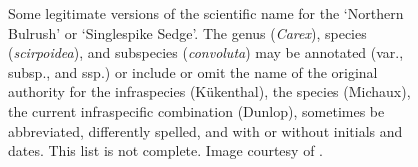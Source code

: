 \documentclass{bmcart}
\begin{document}

\newpage

\begin{figure}
  \begin{center}

  \caption{Some legitimate versions of the scientific name for the `Northern
    Bulrush' or `Singlespike Sedge'. The genus (\textit{Carex}), species
    (\textit{scirpoidea}), and subspecies (\textit{convoluta}) may be annotated
    (var., subsp., and ssp.) or include or omit the name of the original
    authority for the infraspecies (Kükenthal), the species (Michaux), the
    current infraspecific combination (Dunlop), sometimes be abbreviated,
    differently spelled, and with or without initials and dates. This list is
    not complete. Image courtesy of \cite{FNA2002}.}\label{figure:carex}


\end{center}
\end{figure}
\end{document}
